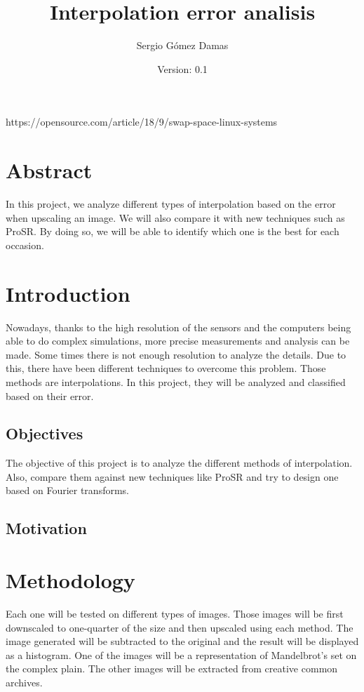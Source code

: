 \documentclass[a4paper,12pt]{article}
\title{Interpolation error analisis}
\author{Sergio Gómez Damas}
\date{Version: 0.1}
\begin{document}
\maketitle
\newpage

\tableofcontents
\newpage
https://opensource.com/article/18/9/swap-space-linux-systems
\section{Abstract}
  In this project, we analyze different types of interpolation based on the error when upscaling an image. We will also compare it with new techniques such as ProSR. By doing so, we will be able to identify which one is the best for each occasion.

%
%

\section{Introduction}\label{sec:introduction}
Nowadays, thanks to the high resolution of the sensors and the computers being able to do complex simulations, more precise measurements and analysis can be made. Some times there is not enough resolution to analyze the details. Due to this, there have been different techniques to overcome this problem. Those methods are interpolations. In this project, they will be analyzed and classified based on their error.
\subsection{Objectives}
The objective of this project is to analyze the different methods of interpolation. Also, compare them against new techniques like ProSR and try to design one based on Fourier transforms.
\subsection{Motivation}



%
%

\section{Methodology}\label{sec:methodology}
Each one will be tested on different types of images. Those images will be first downscaled to one-quarter of the size and then upscaled using each method. The image generated will be subtracted to the original and the result will be displayed as a histogram.
One of the images will be a representation of Mandelbrot's set on the complex plain. The other images will be extracted from creative common archives.
\end{document}
